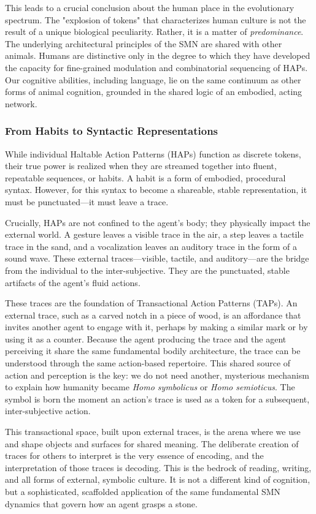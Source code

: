 This leads to a crucial conclusion about the human place in the evolutionary spectrum. The "explosion of tokens" that characterizes human culture is not the result of a unique biological peculiarity. Rather, it is a matter of \textit{predominance}. The underlying architectural principles of the SMN are shared with other animals. Humans are distinctive only in the degree to which they have developed the capacity for fine-grained modulation and combinatorial sequencing of HAPs. Our cognitive abilities, including language, lie on the same continuum as other forms of animal cognition, grounded in the shared logic of an embodied, acting network.

\subsubsection{From Habits to Syntactic Representations}
\label{ssubsec:habits}
While individual Haltable Action Patterns (HAPs) function as discrete tokens, their true power is realized when they are streamed together into fluent, repeatable sequences, or habits. A habit is a form of embodied, procedural syntax. However, for this syntax to become a shareable, stable representation, it must be punctuated—it must leave a trace.

Crucially, HAPs are not confined to the agent's body; they physically impact the external world. A gesture leaves a visible trace in the air, a step leaves a tactile trace in the sand, and a vocalization leaves an auditory trace in the form of a sound wave. These external traces—visible, tactile, and auditory—are the bridge from the individual to the inter-subjective. They are the punctuated, stable artifacts of the agent's fluid actions.

These traces are the foundation of Transactional Action Patterns (TAPs). An external trace, such as a carved notch in a piece of wood, is an affordance that invites another agent to engage with it, perhaps by making a similar mark or by using it as a counter. Because the agent producing the trace and the agent perceiving it share the same fundamental bodily architecture, the trace can be understood through the same action-based repertoire. This shared source of action and perception is the key: we do not need another, mysterious mechanism to explain how humanity became \textit{Homo symbolicus} or \textit{Homo semioticus}. The symbol is born the moment an action's trace is used as a token for a subsequent, inter-subjective action.

This transactional space, built upon external traces, is the arena where we use and shape objects and surfaces for shared meaning. The deliberate creation of traces for others to interpret is the very essence of encoding, and the interpretation of those traces is decoding. This is the bedrock of reading, writing, and all forms of external, symbolic culture. It is not a different kind of cognition, but a sophisticated, scaffolded application of the same fundamental SMN dynamics that govern how an agent grasps a stone.

